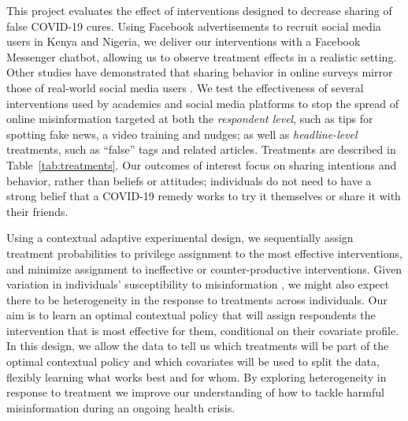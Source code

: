\documentclass[letterpaper, 12pt, parskip=full,]{scrartcl}
\begin{document}
This project evaluates the effect of interventions designed to decrease sharing of false COVID-19 cures. Using Facebook advertisements to recruit social media users in Kenya and Nigeria, we deliver our interventions with a Facebook Messenger chatbot, allowing us to observe treatment effects in a realistic setting. Other studies have demonstrated that sharing behavior in online surveys mirror those of real-world social media users \citep{mosleh2020self}. We test the effectiveness of several interventions used by academics and social media platforms to stop the spread of online misinformation targeted at both the \textit{respondent level}, such as tips for spotting fake news, a video training and nudges; as well as \textit{headline-level} treatments, such as ``false'' tags and related articles. Treatments are described in Table~\ref{tab:treatments}. Our outcomes of interest focus on sharing intentions and behavior, rather than beliefs or attitudes; individuals do not need to have a strong belief that a COVID-19 remedy works to try it themselves or share it with their friends.


Using a contextual adaptive experimental design, we sequentially assign treatment probabilities to privilege assignment to the most effective interventions, and minimize assignment to ineffective or counter-productive interventions. Given variation in individuals' susceptibility to misinformation \citep{wittenberg2020misinformation}, we might also expect there to be heterogeneity in the response to treatments across individuals. Our aim is to learn an optimal contextual policy that will assign respondents the intervention that is most effective for them, conditional on their covariate profile. In this design, we allow the data to tell us which treatments will be part of the optimal contextual policy and which covariates will be used to split the data, flexibly learning what works best and for whom. By exploring heterogeneity in response to treatment we improve our understanding of how to tackle harmful misinformation during an ongoing health crisis. 
\end{document}
